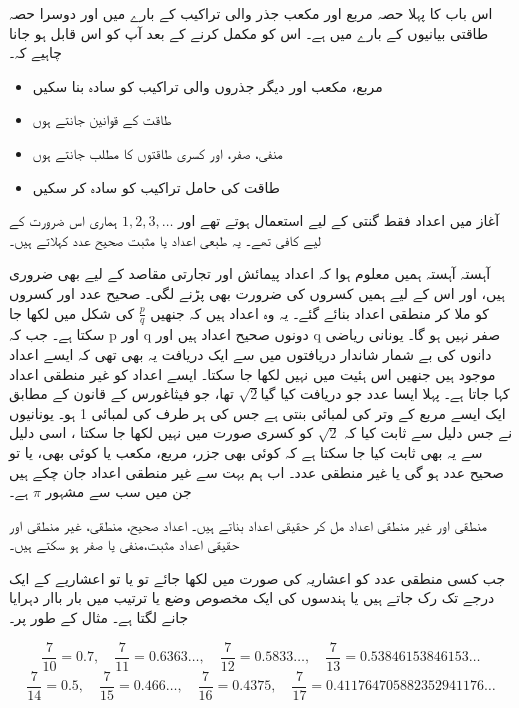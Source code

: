 
اس باب کا پہلا حصہ مربع اور مکعب جذر والی تراکیب کے بارے میں اور دوسرا حصہ طاقتی بیانیوں کے بارے میں ہے۔ اس کو مکمل کرنے کے بعد آپ کو اس قابل ہو جانا چاہیے کہ۔ 
\begin{itemize}
\item
مربع، مکعب اور دیگر جذروں والی تراکیب کو سادہ بنا سکیں
\item
طاقت کے قوانین جانتے ہوں
\item
منفی، صفر، اور کسری طاقتوں کا مطلب جانتے ہوں
\item
طاقت کی حامل تراکیب کو سادہ کر سکیں
\end{itemize}
آغاز میں اعداد فقط گنتی کے لیے استعمال ہوتے تھے اور \(1,2,3,\dotsc\) ہماری اس ضرورت کے لیے کافی تھے۔ یہ طبعی اعداد یا مثبت صحیح عدد کہلاتے ہیں۔ 

آہستہ آہستہ ہمیں معلوم ہوا کہ اعداد پیمائش اور تجارتی مقاصد کے لیے بھی ضروری ہیں، اور اس کے لیے ہمیں کسروں کی ضرورت بھی پڑنے لگی۔ صحیح عدد اور کسروں کو ملا کر منطقی اعداد بنائے گئے۔ یہ وہ اعداد ہیں کہ جنھیں \(\frac{p}{q}\) کی شکل میں لکھا جا سکتا ہے۔ جب کہ p اور q  دونوں صحیح اعداد ہیں اور q صفر نہیں ہو گا۔
یونانی ریاضی دانوں کی بے شمار شاندار دریافتوں میں سے ایک دریافت یہ بھی تھی کہ ایسے اعداد موجود ہیں جنھیں اس ہئیت میں نہیں لکھا جا سکتا۔ ایسے اعداد کو غیر منطقی اعداد کہا جاتا ہے۔ پہلا ایسا عدد جو دریافت کیا گیا\(\sqrt{2}\) تھا، جو فیثاغورس کے قانون کے مطابق ایک ایسے مربع کے وتر کی لمبائی بنتی ہے جس کی ہر طرف کی لمبائی 1 ہو۔ یونانیوں نے جس دلیل سے ثابت کیا کہ \(\sqrt{2}\) کو کسری صورت میں نہیں لکھا جا سکتا ، اسی دلیل سے یہ بھی ثابت کیا جا سکتا ہے کہ کوئی بھی جزر، مربع، مکعب یا کوئی بھی، یا تو صحیح عدد ہو گی یا غیر منطقی عدد۔ اب ہم بہت سے غیر منطقی اعداد جان چکے ہیں جن میں سب سے مشہور \(\pi\) ہے۔

منطقی اور غیر منطقی اعداد مل کر حقیقی اعداد بناتے ہیں۔ اعداد صحیح، منطقی، غیر منطقی اور حقیقی اعداد مثبت،منفی یا صفر ہو سکتے ہیں۔

جب کسی منطقی عدد کو اعشاریہ کی صورت میں لکھا جائے تو یا تو اعشاریے کے ایک درجے تک رک جاتے ہیں یا ہندسوں کی ایک مخصوص وضع یا ترتیب میں  بار باار دہرایا جانے لگتا ہے۔  مثال کے طور پر۔ 

\[\frac{7}{10}=0.7,\quad \frac{7}{11}=0.6363\dotsc,\quad\frac{7}{12}=0.5833\dotsc,\quad\frac{7}{13}=0.538 461 538 461 53\dotsc\]
\[\frac{7}{14}=0.5,\quad\frac{7}{15}=0.466\dotsc,\quad\frac{7}{16}=0.4375,\quad\frac{7}{17}=0.411 764 705 882 352941176\dotsc\]

